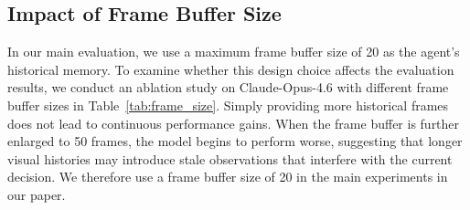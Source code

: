 \documentclass[11pt]{article}
\begin{document}
\begin{table}[t!]
\centering
{}
\caption{Average number of environment steps on completed tasks and all tasks, where failed episodes are counted as 1,800 steps.}
\label{tab:interaction_rounds}
\end{table}

\subsection{Impact of Frame Buffer Size}
\label{sec: Impact of Frame Buffer Size}

In our main evaluation, we use a maximum frame buffer size of 20 as the agent's historical memory. 
To examine whether this design choice affects the evaluation results, we conduct an ablation study on Claude-Opus-4.6 with different frame buffer sizes in Table~\ref{tab:frame_size}. 
Simply providing more historical frames does not lead to continuous performance gains. 
When the frame buffer is further enlarged to 50 frames, the model begins to perform worse, suggesting that longer visual histories may introduce stale observations that interfere with the current decision. 
We therefore use a frame buffer size of 20 in the main experiments in our paper.
\end{document}
